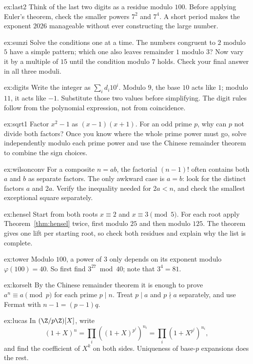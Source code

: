 \begin{hint}{ex:last2}
Think of the last two digits as a residue modulo $100$. Before applying Euler's theorem, check the smaller powers $7^2$ and $7^4$. A short period makes the exponent $2026$ manageable without ever constructing the large number.
\end{hint}
\begin{hint}{ex:sunzi}
Solve the conditions one at a time. The numbers congruent to $2$ modulo $5$ have a simple pattern; which one also leaves remainder $1$ modulo $3$? Now vary it by a multiple of $15$ until the condition modulo $7$ holds. Check your final answer in all three moduli.
\end{hint}
\begin{hint}{ex:digits}
Write the integer as $\sum_i d_i10^i$. Modulo $9$, the base $10$ acts like $1$; modulo $11$, it acts like $-1$. Substitute those two values before simplifying. The digit rules follow from the polynomial expression, not from coincidence.
\end{hint}
\begin{hint}{ex:sqrt1}
Factor $x^2-1$ as $(x-1)(x+1)$. For an odd prime $p$, why can $p$ not divide both factors? Once you know where the whole prime power must go, solve independently modulo each prime power and use the Chinese remainder theorem to combine the sign choices.
\end{hint}
\begin{hint}{ex:wilsonconv}
For a composite $n=ab$, the factorial $(n-1)!$ often contains both $a$ and $b$ as separate factors. The only awkward case is $a=b$: look for the distinct factors $a$ and $2a$. Verify the inequality needed for $2a<n$, and check the smallest exceptional square separately.
\end{hint}
\begin{hint}{ex:hensel}
Start from both roots $x\equiv2$ and $x\equiv3\pmod5$.
For each root apply Theorem~\ref{thm:hensel} twice, first modulo $25$
and then modulo $125$. The theorem gives one lift per starting root,
so check both residues and explain why the list is complete.
\end{hint}
\begin{hint}{ex:tower}
Modulo $100$, a power of $3$ only depends on its exponent modulo $\varphi(100)=40$. So first find $3^{27}\bmod40$; note that $3^4=81$.
\end{hint}
\begin{hint}{ex:korselt}
By the Chinese remainder theorem it is enough to prove $a^n\equiv a\pmod p$ for each prime $p\mid n$. Treat $p\mid a$ and $p\nmid a$ separately, and use Fermat with $n-1=(p-1)q$.
\end{hint}
\begin{hint}{ex:lucas}
In $(\Z/p\Z)[X]$, write
\[(1+X)^n=\prod_i\left((1+X)^{p^i}\right)^{n_i}=\prod_i\left(1+X^{p^i}\right)^{n_i},\]
and find the coefficient of $X^k$ on both sides. Uniqueness of base-$p$ expansions does the rest.
\end{hint}

